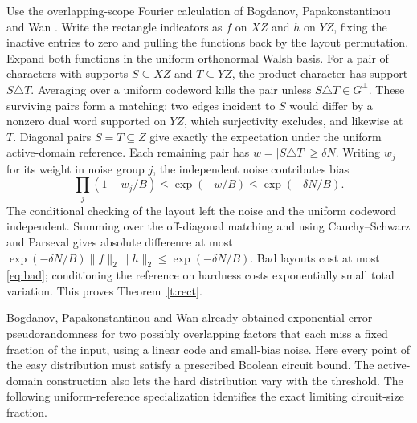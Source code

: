 \documentclass[11pt]{article}
\begin{document}
Use the overlapping-scope Fourier calculation of Bogdanov, Papakonstantinou and Wan \cite[Lemma~1]{bpw12}. Write the rectangle indicators as $f$ on $XZ$ and $h$ on $YZ$, fixing the inactive entries to zero and pulling the functions back by the layout permutation. Expand both functions in the uniform orthonormal Walsh basis. For a pair of characters with supports $S\subseteq XZ$ and $T\subseteq YZ$, the product character has support $S\triangle T$. Averaging over a uniform codeword kills the pair unless $S\triangle T\in G^\perp$. These surviving pairs form a matching: two edges incident to $S$ would differ by a nonzero dual word supported on $YZ$, which surjectivity excludes, and likewise at $T$. Diagonal pairs $S=T\subseteq Z$ give exactly the expectation under the uniform active-domain reference. Each remaining pair has $w=|S\triangle T|\ge\delta N$. Writing $w_j$ for its weight in noise group $j$, the independent noise contributes bias
\[
 \prod_j (1-w_j/B)\le \exp(-w/B)\le\exp(-\delta N/B).
\]
The conditional checking of the layout left the noise and the uniform codeword independent. Summing over the off-diagonal matching and using Cauchy--Schwarz and Parseval gives absolute difference at most $\exp(-\delta N/B)\|f\|_2\|h\|_2\le\exp(-\delta N/B)$. Bad layouts cost at most \eqref{eq:bad}; conditioning the reference on hardness costs exponentially small total variation. This proves Theorem~\ref{t:rect}.

Bogdanov, Papakonstantinou and Wan \cite[Lemma~2 and its following remarks]{bpw} already obtained exponential-error pseudorandomness for two possibly overlapping factors that each miss a fixed fraction of the input, using a linear code and small-bias noise. Here every point of the easy distribution must satisfy a prescribed Boolean circuit bound. The active-domain construction also lets the hard distribution vary with the threshold. The following uniform-reference specialization identifies the exact limiting circuit-size fraction.
\end{document}

